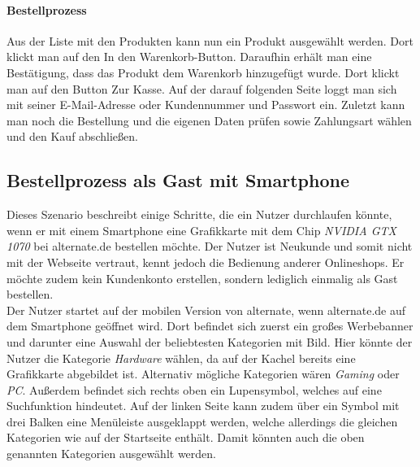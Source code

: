 \documentclass[	12pt, 
				a4paper, 
				BCOR=10mm, %
				DIV=12, 
				parskip=half, %
				headings=small, %
				twoside, %
				ngerman,
				bibliography=totoc,index=totoc, listof=totoc,
				numbers=noendperiod
				]{scrbook} %
\theoremstyle{plain}%
\theoremstyle{definition}
\theoremstyle{remark}
\begin{document}
\paragraph{Bestellprozess}
Aus der Liste mit den Produkten kann nun ein Produkt ausgewählt werden. Dort klickt man auf den \glqq In den Warenkorb\grqq{}-Button. Daraufhin erhält man eine Bestätigung, dass das Produkt dem Warenkorb hinzugefügt wurde. Dort klickt man auf den Button \glqq Zur Kasse\grqq{}. Auf der darauf folgenden Seite loggt man sich mit seiner E-Mail-Adresse oder Kundennummer und Passwort ein. Zuletzt kann man noch die Bestellung und die eigenen Daten prüfen sowie Zahlungsart wählen und den Kauf abschließen.

\subsection{Bestellprozess als Gast mit Smartphone}
Dieses Szenario beschreibt einige Schritte, die ein Nutzer durchlaufen könnte, wenn er mit einem Smartphone eine Grafikkarte mit dem Chip \textit{NVIDIA GTX 1070} bei alternate.de bestellen möchte. Der Nutzer ist Neukunde und somit nicht mit der Webseite vertraut, kennt jedoch die Bedienung anderer Onlineshops. Er möchte zudem kein Kundenkonto erstellen, sondern lediglich einmalig als Gast bestellen.\\
Der Nutzer startet auf der mobilen Version von alternate, wenn alternate.de auf dem Smartphone geöffnet wird. Dort befindet sich zuerst ein großes Werbebanner und darunter eine Auswahl der beliebtesten Kategorien mit Bild. Hier könnte der Nutzer die Kategorie \textit{Hardware} wählen, da auf der Kachel bereits eine Grafikkarte abgebildet ist. Alternativ mögliche Kategorien wären \textit{Gaming} oder \textit{PC}. Außerdem befindet sich rechts oben ein Lupensymbol, welches auf eine Suchfunktion hindeutet. Auf der linken Seite kann zudem über ein Symbol mit drei Balken eine Menüleiste ausgeklappt werden, welche allerdings die gleichen Kategorien wie auf der Startseite enthält. Damit könnten auch die oben genannten Kategorien ausgewählt werden.
\end{document}
